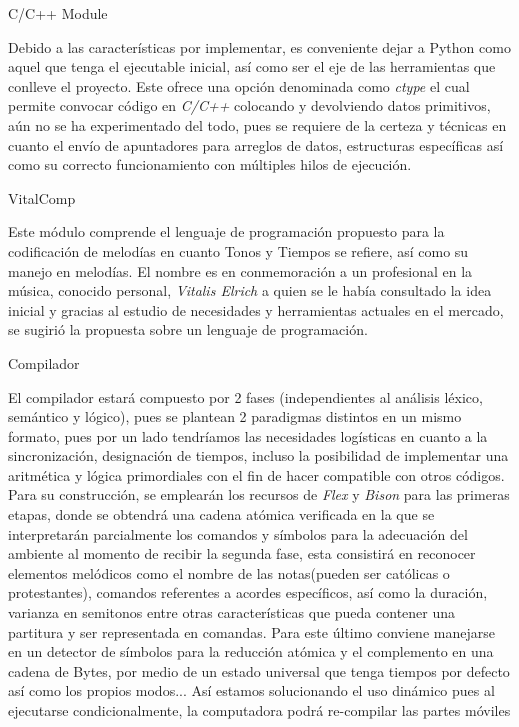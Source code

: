 \documentclass{book}
\begin{document}
	{\normalsize C/C++ Module}\par
	Debido a las características por implementar, es conveniente dejar a Python como aquel que tenga el ejecutable inicial, así como ser el eje de las herramientas que conlleve el proyecto. Este ofrece una opción denominada como \emph{ctype} el cual permite convocar código en \emph{C/C++} colocando y devolviendo datos primitivos, aún no se ha experimentado del todo, pues se requiere de la certeza y técnicas en cuanto el envío de apuntadores para arreglos de datos, estructuras específicas así como su correcto funcionamiento con múltiples hilos de ejecución.\pagebreak
	
	{\large VitalComp}\par
	Este módulo comprende el lenguaje de programación propuesto para la codificación de melodías en cuanto Tonos y Tiempos se refiere, así como su manejo en melodías. El nombre es en conmemoración a un profesional en la música, conocido personal, \emph{Vitalis Elrich} a quien se le había consultado la idea inicial y gracias al estudio de necesidades y herramientas actuales en el mercado, se sugirió la propuesta sobre un lenguaje de programación.\par
	{\normalsize Compilador}\par
	El compilador estará compuesto por 2 fases (independientes al análisis léxico, semántico y lógico), pues se plantean 2 paradigmas distintos en un mismo formato, pues por un lado tendríamos las necesidades logísticas en cuanto a la sincronización, designación de tiempos, incluso la posibilidad de implementar una aritmética y lógica primordiales con el fin de hacer compatible con otros códigos.
	Para su construcción, se emplearán los recursos de \emph{Flex} y \emph{Bison} para las primeras etapas, donde se obtendrá una cadena atómica verificada en la que se interpretarán parcialmente los comandos y símbolos para la adecuación del ambiente al momento de recibir la segunda fase, esta consistirá en reconocer elementos melódicos como el nombre de las notas(pueden ser católicas o protestantes), comandos referentes a acordes específicos, así como la duración, varianza en semitonos entre otras características que pueda contener una partitura y ser representada en comandas. Para este último conviene manejarse en un detector de símbolos para la reducción atómica y el complemento en una cadena de Bytes, por medio de un estado universal que tenga tiempos por defecto así como los propios modos... Así estamos solucionando el uso dinámico pues al ejecutarse condicionalmente, la computadora podrá re-compilar las partes móviles\par
\end{document}
